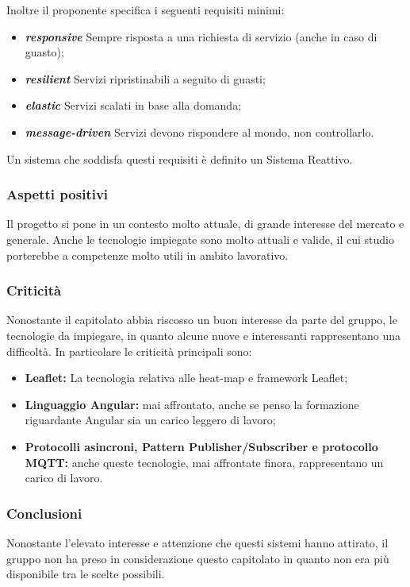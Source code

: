 Inoltre il proponente specifica i seguenti requisiti minimi:
\begin{itemize}
	\item \textbf{\textit{responsive}} Sempre risposta a una richiesta di servizio (anche in caso di guasto);
	\item \textbf{\textit{resilient}} Servizi ripristinabili a seguito di guasti;
	\item \textbf{\textit{elastic}} Servizi scalati in base alla domanda;
	\item \textbf{\textit{message-driven}} Servizi devono rispondere al mondo, non controllarlo.
\end{itemize}
Un sistema che soddisfa questi requisiti è definito un Sistema Reattivo.


\subsubsection{Aspetti positivi}

Il progetto si pone in un contesto molto attuale, di grande interesse del mercato e generale.
Anche le tecnologie impiegate sono molto attuali e valide, il cui studio porterebbe a competenze molto utili in ambito lavorativo.



\subsubsection{Criticità}

Nonostante il capitolato abbia riscosso un buon interesse da parte del gruppo, le tecnologie da impiegare, in quanto alcune nuove e interessanti rappresentano una difficoltà.
In particolare le criticità principali sono:
\begin{itemize}
    \item \textbf{Leaflet:} La tecnologia relativa alle heat-map e framework Leaflet;
    \item \textbf{Linguaggio Angular:} mai affrontato, anche se penso la formazione riguardante Angular sia un carico leggero di lavoro;
    \item \textbf{Protocolli asincroni, Pattern Publisher/Subscriber e protocollo MQTT: } anche queste tecnologie, mai affrontate finora, rappresentano un carico di lavoro.
\end{itemize}


\subsubsection{Conclusioni}

Nonostante l'elevato interesse e attenzione che questi sistemi hanno attirato, il gruppo non ha preso in considerazione questo capitolato in quanto non era più disponibile tra le scelte possibili.
